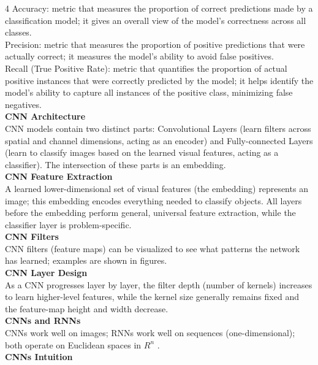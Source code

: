 \documentclass[8pt]{extarticle}
\begin{document}
\begin{multicols}{4}
Accuracy: metric that measures the proportion of correct predictions made by a classification model; it gives an overall view of the model's correctness across all classes.\\
Precision: metric that measures the proportion of positive predictions that were actually correct; it measures the model's ability to avoid false positives.\\
Recall (True Positive Rate): metric that quantifies the proportion of actual positive instances that were correctly predicted by the model; it helps identify the model's ability to capture all instances of the positive class, minimizing false negatives.\\
\vspace{2pt}\textbf{CNN Architecture}\\
CNN models contain two distinct parts: Convolutional Layers (learn filters across spatial and channel dimensions, acting as an encoder) and Fully-connected Layers (learn to classify images based on the learned visual features, acting as a classifier). The intersection of these parts is an embedding.\\
\vspace{2pt}\textbf{CNN Feature Extraction}\\
A learned lower-dimensional set of visual features (the embedding) represents an image; this embedding encodes everything needed to classify objects. All layers before the embedding perform general, universal feature extraction, while the classifier layer is problem-specific.\\
\vspace{2pt}\textbf{CNN Filters}\\
CNN filters (feature maps) can be visualized to see what patterns the network has learned; examples are shown in figures.\\
\vspace{2pt}\textbf{CNN Layer Design}\\
As a CNN progresses layer by layer, the filter depth (number of kernels) increases to learn higher-level features, while the kernel size generally remains fixed and the feature-map height and width decrease.\\
\vspace{2pt}\textbf{CNNs and RNNs}\\
CNNs work well on images; RNNs work well on sequences (one-dimensional); both operate on Euclidean spaces in $R^{n}$ .\\
\vspace{2pt}\textbf{CNNs Intuition}\\

\end{multicols}
\end{document}

